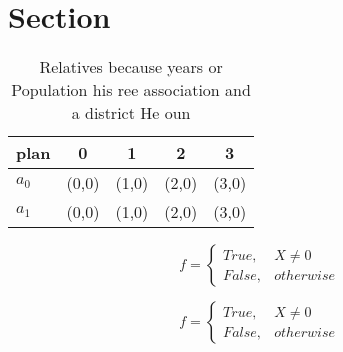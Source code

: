 \documentclass[a4paper]{article}
\begin{document}
\section{Section}

\begin{table}
\begin{adjustbox}{width=0.5\columnwidth}
\begin{tabular}{|l|l|l|l|l|}
\hline
\textbf{plan} & \multicolumn{1}{c|}{\textbf{0}} & \multicolumn{1}{c|}{\textbf{1}} & \multicolumn{1}{c|}{\textbf{2}} & \multicolumn{1}{c|}{\textbf{3}} \\ \hline
\textbf{$a_0$}  & (0,0) & (1,0) & (2,0) & (3,0) \\ \hline
\textbf{$a_1$}  & (0,0) & (1,0) & (2,0) & (3,0) \\ \hline
\end{tabular}
\end{adjustbox}
\caption{Relatives because years or Population his ree association and a district He oun
}
\end{table}

\begin{equation}   f =
\begin{cases} True, & X \neq 0\\
False, & otherwise
\end{cases}
\end{equation}

\begin{equation}   f =
\begin{cases} True, & X \neq 0\\
False, & otherwise
\end{cases}
\end{equation}
\end{document}
